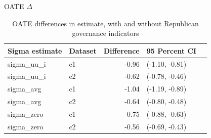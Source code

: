 \documentclass[hyperref={pdfpagelabels=false}]{beamer}
\newcommand{\backupend}{
   \setcounter{framenumber}{\value{finalframe}}
}
\begin{document}
\begin{frame}{OATE $\Delta$}
\begin{table}[ht]
\centering
\begin{tabular}{llrll}
  \toprule
Sigma estimate & Dataset & Difference & 95 Percent CI\\ 
  \midrule
  sigma\_uu\_i & c1 & -0.96 & (-1.10, -0.81) \\ 
  sigma\_uu\_i & c2 & -0.62 & (-0.78, -0.46) \\ 
  sigma\_avg & c1 & -1.04 & (-1.19, -0.89) \\ 
  sigma\_avg & c2 & -0.64 & (-0.80, -0.48) \\ 
  sigma\_zero & c1 & -0.75 & (-0.88, -0.63) \\ 
  sigma\_zero & c2 & -0.56 & (-0.69, -0.43) \\ 
   \bottomrule
\end{tabular}
\caption{OATE differences in estimate, with and without Republican governance indicators}
\label{tab:oaterepubdiff}
\end{table}
\end{frame}

\backupend
\end{document}
